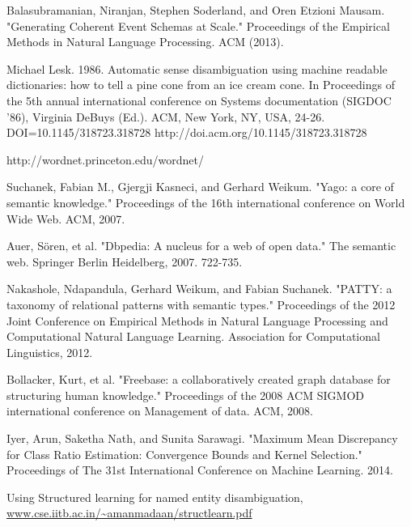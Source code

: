 \begin{frame}[allowframebreaks]
\begin{thebibliography}{9}
 \label{cohschemas}
Balasubramanian, Niranjan, Stephen Soderland, and Oren Etzioni Mausam. "Generating Coherent Event Schemas at Scale." Proceedings of the Empirical Methods in Natural Language Processing. ACM (2013).

 \label{lesk}
Michael Lesk. 1986. Automatic sense disambiguation using machine readable dictionaries: how to tell a pine cone from an ice cream cone. In Proceedings of the 5th annual international conference on Systems documentation (SIGDOC '86), Virginia DeBuys (Ed.). ACM, New York, NY, USA, 24-26. DOI=10.1145/318723.318728 http://doi.acm.org/10.1145/318723.318728

 \label{wordnet}
http://wordnet.princeton.edu/wordnet/

 \label{yago}
Suchanek, Fabian M., Gjergji Kasneci, and Gerhard Weikum. "Yago: a core of semantic knowledge." Proceedings of the 16th international conference on World Wide Web. ACM, 2007.

 \label{dbpedia}
Auer, Sören, et al. "Dbpedia: A nucleus for a web of open data." The semantic web. Springer Berlin Heidelberg, 2007. 722-735.

 \label{patty}
Nakashole, Ndapandula, Gerhard Weikum, and Fabian Suchanek. "PATTY: a taxonomy of relational patterns with semantic types." Proceedings of the 2012 Joint Conference on Empirical Methods in Natural Language Processing and Computational Natural Language Learning. Association for Computational Linguistics, 2012.

 \label{freebase}
Bollacker, Kurt, et al. "Freebase: a collaboratively created graph database for structuring human knowledge." Proceedings of the 2008 ACM SIGMOD international conference on Management of data. ACM, 2008.

 \label{mmd}
Iyer, Arun, Saketha Nath, and Sunita Sarawagi. "Maximum Mean Discrepancy for Class Ratio Estimation: Convergence Bounds and Kernel Selection." Proceedings of The 31st International Conference on Machine Learning. 2014.

 \label{aidafeature}
Using Structured learning for named entity disambiguation, \url{www.cse.iitb.ac.in/~amanmadaan/structlearn.pdf}
\end{thebibliography}
\end{frame}